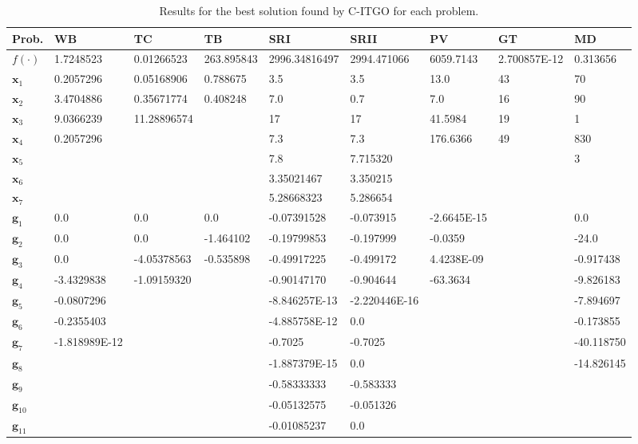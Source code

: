 
\noindent
\begin{table*}[tp]
    \tiny
\begin{center}
\begin{adjustwidth}{-1cm}{}
\begin{tabular}{ | P{1.0cm} | P{1.5cm} |  P{1.5cm} | P{1.5cm} | P{1.5cm} | P{1.5cm} | P{1.5cm} | P{1.5cm} | P{1.5cm} |  }
\hline
\textbf{Prob.} & \textbf{WB} & \textbf{TC} & \textbf{TB} & \textbf{SRI} & \textbf{SRII} & \textbf{PV} & \textbf{GT} & \textbf{MD} \\
\hline
\rule{0pt}{3ex}
$f(\cdot)$ & 1.7248523 & 0.01266523 & 263.895843 & 2996.34816497 & 2994.471066 & 6059.7143 & 2.700857E-12 & 0.313656 \\
\hline
\rule{0pt}{3ex}
$\bm{x}_1$ &  0.2057296 & 0.05168906 & 0.788675 & 3.5 & 3.5 & 13.0 & 43 & 70  \\
$\bm{x}_2$ &  3.4704886 & 0.35671774 & 0.408248 & 7.0 & 0.7 & 7.0 & 16 & 90 \\
$\bm{x}_3$ &  9.0366239 & 11.28896574 & & 17 & 17 & 41.5984 & 19 &  1  \\
$\bm{x}_4$ &  0.2057296 & & & 7.3 & 7.3 & 176.6366 & 49 & 830  \\
$\bm{x}_5$ & & & & 7.8 & 7.715320 & & & 3 \\
$\bm{x}_6$ & & & & 3.35021467 & 3.350215 & & &   \\
$\bm{x}_7$ & & & & 5.28668323 & 5.286654 & & &   \\
\hline
\rule{0pt}{3ex}
$\bm{g}_1$ & 0.0 & 0.0 & 0.0 & -0.07391528 & -0.073915 & -2.6645E-15 & & 0.0  \\
$\bm{g}_2$ & 0.0 & 0.0 & -1.464102 & -0.19799853 & -0.197999 & -0.0359 & & -24.0  \\
$\bm{g}_3$ & 0.0 & -4.05378563 & -0.535898 & -0.49917225 & -0.499172 & 4.4238E-09 & & -0.917438 \\
$\bm{g}_4$ & -3.4329838 & -1.09159320 & & -0.90147170 & -0.904644 & -63.3634 & & -9.826183  \\
$\bm{g}_5$ & -0.0807296 & & & -8.846257E-13 & -2.220446E-16 & & &  -7.894697 \\
$\bm{g}_6$ & -0.2355403 & & & -4.885758E-12 & 0.0 & & & -0.173855  \\
$\bm{g}_7$ & -1.818989E-12 & & & -0.7025 & -0.7025 & & & -40.118750 \\
$\bm{g}_8$ & & & & -1.887379E-15 & 0.0 & & &  -14.826145 \\
$\bm{g}_9$ & & & & -0.58333333 & -0.583333 & & &    \\
$\bm{g}_{10}$ & & & & -0.05132575 & -0.051326 & & &    \\
$\bm{g}_{11}$ & & & & -0.01085237 & 0.0 & & &    \\
\hline
\end{tabular}
\end{adjustwidth}
\end{center}
\vspace*{-6mm}
\caption{ Results for the best solution found by C-ITGO for each problem. \\[1em]}
\label{tab:BestResults}
\end{table*}

